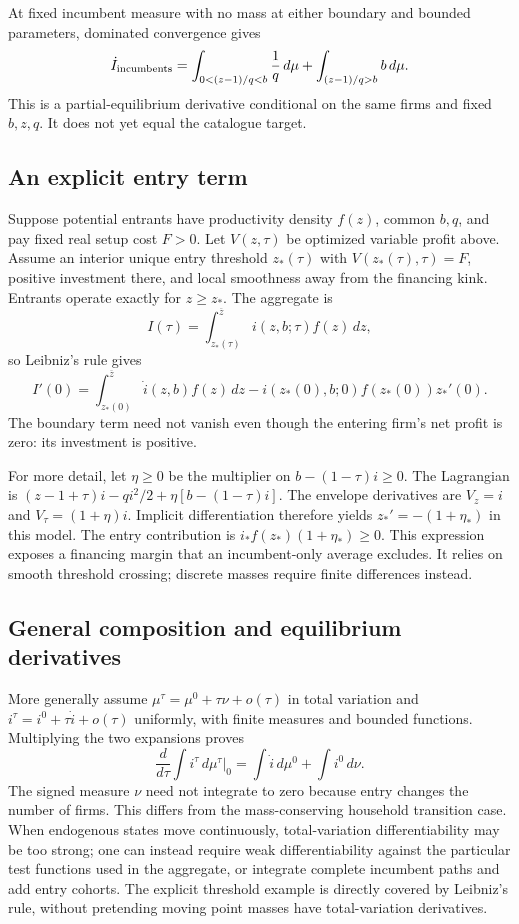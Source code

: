 \documentclass[11pt]{article}
\begin{document}
At fixed incumbent measure with no mass at either boundary and bounded
parameters, dominated convergence gives
\[
 \dot I_{\rm incumbents}
 =\int_{0<(z-1)/q<b}\frac1q\,d\mu
  +\int_{(z-1)/q>b}b\,d\mu.
\]
This is a partial-equilibrium derivative conditional on the same firms and
fixed $b,z,q$. It does not yet equal the catalogue target.

\subsection*{An explicit entry term}
Suppose potential entrants have productivity density $f(z)$, common $b,q$,
and pay fixed real setup cost $F>0$. Let $V(z,\tau)$ be optimized variable
profit above. Assume an interior unique entry threshold $z_*(\tau)$ with
$V(z_*(\tau),\tau)=F$, positive investment there, and local smoothness
away from the financing kink. Entrants operate exactly for $z\geq z_*$.
The aggregate is
\[
 I(\tau)=\int_{z_*(\tau)}^{\overline z}i(z,b;\tau)f(z)\,dz,
\]
so Leibniz's rule gives
\[
 I'(0)=\int_{z_*(0)}^{\overline z}\dot i(z,b)f(z)\,dz
       -i(z_*(0),b;0)f(z_*(0))z_*'(0).
\]
The boundary term need not vanish even though the entering firm's net
profit is zero: its investment is positive.

For more detail, let $\eta\geq0$ be the multiplier on
$b-(1-\tau)i\geq0$. The Lagrangian is
$(z-1+\tau)i-qi^2/2+\eta[b-(1-\tau)i]$.
The envelope derivatives are $V_z=i$ and $V_\tau=(1+\eta)i$.
Implicit differentiation therefore yields
$z_*'=-(1+\eta_*)$ in this model. The entry contribution is
$i_*f(z_*)(1+\eta_*)\geq0$. This expression exposes a financing margin
that an incumbent-only average excludes. It relies on smooth threshold
crossing; discrete masses require finite differences instead.

\subsection*{General composition and equilibrium derivatives}
More generally assume
$\mu^\tau=\mu^0+\tau\nu+o(\tau)$ in total variation and
$i^\tau=i^0+\tau\dot i+o(\tau)$ uniformly, with finite measures and
bounded functions. Multiplying the two expansions proves
\[
 \frac{d}{d\tau}\int i^\tau\,d\mu^\tau\bigg|_0
 =\int\dot i\,d\mu^0+\int i^0\,d\nu.
\]
The signed measure $\nu$ need not integrate to zero because entry changes
the number of firms. This differs from the mass-conserving household
transition case. When endogenous states move continuously, total-variation
differentiability may be too strong; one can instead require weak
differentiability against the particular test functions used in the
aggregate, or integrate complete incumbent paths and add entry cohorts.
The explicit threshold example is directly covered by Leibniz's rule,
without pretending moving point masses have total-variation derivatives.
\end{document}
